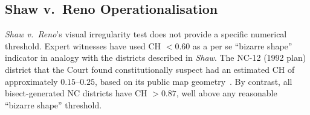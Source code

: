 \subsection{Shaw v.\ Reno Operationalisation}

\textit{Shaw v.\ Reno}'s visual irregularity test does not provide a specific
numerical threshold. Expert witnesses have used CH $< 0.60$ as a per se
``bizarre shape'' indicator in analogy with the districts described in \textit{Shaw}.
The NC-12 (1992 plan) district that the Court found constitutionally suspect
had an estimated CH of approximately $0.15$--$0.25$, based on its public
map geometry~\citep{niemi1990measuring}.
By contrast, all bisect-generated NC districts have CH $> 0.87$, well above
any reasonable ``bizarre shape'' threshold.
